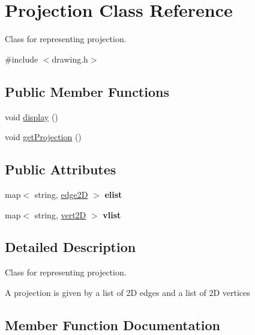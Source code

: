 \hypertarget{class_projection}{}\section{Projection Class Reference}
\label{class_projection}


Class for representing projection.  




{\ttfamily \#include $<$drawing.\+h$>$}

\subsection*{Public Member Functions}
\begin{DoxyCompactItemize}
\item 
void \mbox{\hyperlink{class_projection_a64871b1bca81515ba173648cdad3a554}{display}} ()
\item 
void \mbox{\hyperlink{class_projection_a3b63599362a22239df0dc6d262c4c54c}{get\+Projection}} ()
\end{DoxyCompactItemize}
\subsection*{Public Attributes}
\begin{DoxyCompactItemize}
\item 
\mbox{\label{class_projection_a01b6134fd498b88448a8ae68caf9fe16}} 
map$<$ string, \mbox{\hyperlink{structedge2_d}{edge2D}} $>$ {\bfseries elist}
\item 
\mbox{\label{class_projection_abef70fe91cb06a2f43cf6337bd10f552}} 
map$<$ string, \mbox{\hyperlink{structvert2_d}{vert2D}} $>$ {\bfseries vlist}
\end{DoxyCompactItemize}


\subsection{Detailed Description}
Class for representing projection. 

A projection is given by a list of 2D edges and a list of 2D vertices 

\subsection{Member Function Documentation}
\mbox{\label{class_projection_a64871b1bca81515ba173648cdad3a554}} 
